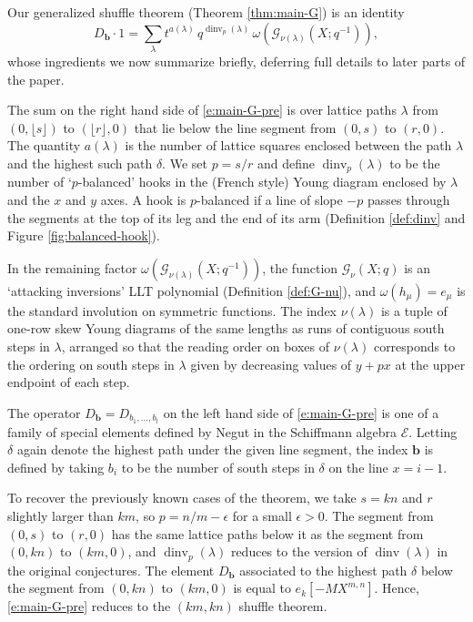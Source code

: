 \documentclass[12pt]{amsart}
\theoremstyle{definition}
\theoremstyle{remark}
\newcommand{\bb}{{\mathbf b}}
\newcommand{\Ecal}{{\mathcal E}}
\newcommand{\Gcal}{{\mathcal G}}
\DeclareMathOperator{\dinv}{dinv}
\begin{document}
Our generalized shuffle theorem (Theorem \ref{thm:main-G}) is an
identity
\begin{equation}\label{e:main-G-pre}
D_{\bb }\cdot 1 = \sum _{\lambda } t^{a(\lambda )}\, q^{\dinv
_{p}(\lambda )}\, \omega (\Gcal _{\nu (\lambda )}(X; q^{-1})),
\end{equation}
whose ingredients we now summarize briefly, deferring full details to
later parts of the paper.

The sum on the right hand side of \eqref{e:main-G-pre} is over lattice
paths $\lambda $ from $(0,\lfloor s \rfloor)$ to $(\lfloor r \rfloor,
0)$ that lie below the line segment from $(0,s)$ to $(r,0)$.  The
quantity $a(\lambda )$ is the number of lattice squares enclosed
between the path $\lambda $ and the highest such path $\delta $.  We
set $p = s/r$ and define $\dinv _{p}(\lambda )$ to be the number
of `$p$-balanced' hooks in the (French style) Young diagram enclosed
by $\lambda $ and the $x$ and $y$ axes.  A hook is $p$-balanced if a
line of slope $-p$ passes through the segments at the top of its leg
and the end of its arm (Definition \ref{def:dinv} and Figure
\ref{fig:balanced-hook}).

In the remaining factor $\omega (\Gcal _{\nu (\lambda )}(X;q^{-1}))$,
the function $\Gcal _{\nu }(X;q)$ is an `attacking inversions' LLT
polynomial (Definition \ref{def:G-nu}),
and $\omega (h_{\mu }) = e_{\mu }$ is the standard involution on
symmetric functions.  The index $\nu (\lambda )$ is a tuple of one-row
skew Young diagrams of the same lengths as runs of contiguous south
steps in $\lambda $, arranged so that the reading order on boxes of
$\nu (\lambda )$ corresponds to the ordering on south steps in
$\lambda $ given by decreasing values of $y+px$ at the upper endpoint
of each step.

The operator $D_{\bb } = D_{b_{1},\ldots,b_{l}}$ on the left hand side
of \eqref{e:main-G-pre} is one of a family of special elements defined
by Negut \cite{Negut14} in the Schiffmann algebra $\Ecal $.  Letting
$\delta $ again denote the highest path under the given line segment,
the index $\bb $ is defined by taking $b_{i}$ to be the number of
south steps in $\delta $ on the line $x = i-1$.

To recover the previously known cases of the theorem, we take $s = kn$
and $r$ slightly larger than $km$, so $p = n/m-\epsilon $ for a small
$\epsilon >0$.  The segment from $(0,s)$ to $(r,0)$ has the same
lattice paths below it as the segment from $(0,kn)$ to $(km,0)$, and
$\dinv _{p}(\lambda )$ reduces to the version of $\dinv (\lambda )$ in
the original conjectures.  The element $D_{\bb }$ associated to the
highest path $\delta $ below the segment from $(0,kn)$ to $(km,0)$ is
equal to $e_{k}[-M X^{m,n}]$.  Hence, \eqref{e:main-G-pre} reduces to
the $(km,kn)$ shuffle theorem.
\end{document}
